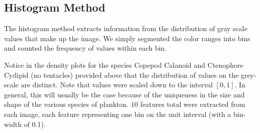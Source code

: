\documentclass[12pt]{article}
\begin{document}
\subsection{Histogram Method}
The histogram method extracts information from the distribution of gray scale values that make up the image. We simply segmented the color ranges into bins and counted the frequency of values within each bin. 
\begin{figure}[h]
	\begin{center}
	\end{center}
\end{figure}
Notice in the density plots for the species Copepod Calanoid and Ctenophore Cydipid (no tentacles)  provided above that the distribution of values on the grey-scale are distinct. Note that values were scaled down to the interval $[0,1]$. In general, this will usually be the case because of the uniqueness in the size and shape of the various species of plankton. $10$ features total were extracted from each image, each feature representing one bin on the unit interval (with a bin-width of 0.1).
	
\end{document}
